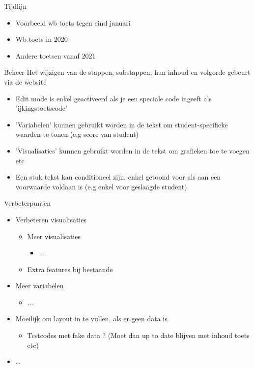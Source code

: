 \documentclass{beamer}
\begin{document}
\begin{frame}{Tijdlijn}
    \begin{itemize}
        \item Voorbeeld wb toets tegen eind januari
        \item Wb toets in 2020
        \item Andere toetsen vanaf 2021 
    \end{itemize}
\end{frame}

\begin{frame}{Beheer}
Het wijzigen van de stappen, substappen, hun inhoud en volgorde gebeurt via de website
	\begin{itemize}
		\item Edit mode is enkel geactiveerd als je een speciale code ingeeft als 'ijkingstoetscode'
		\item 'Variabelen' kunnen gebruikt worden in de tekst om student-specifieke waarden te tonen (e.g score van student)
		\item 'Visualisaties' kunnen gebruikt worden in de tekst om grafieken toe te voegen etc
		\item Een stuk tekst kan conditioneel zijn, enkel getoond voor als aan een voorwaarde voldaan is (e.g enkel voor geslaagde student)
	\end{itemize}
\end{frame}

\begin{frame}{Verbeterpunten}
    \begin{itemize}
    \item Verbeteren visualisaties
    \begin{itemize}
        \item Meer visualisaties
            \begin{itemize}
                \item ...
            \end{itemize}
        \item Extra features bij bestaande
    \end{itemize}
    \item Meer variabelen
    \begin{itemize}
    \item ...
    \end{itemize}
    \item Moeilijk om layout in te vullen, als er geen data is
        \begin{itemize}
            \item Testcodes met fake data ? (Moet dan up to date blijven met inhoud toets etc)
        \end{itemize}
     \item \ldots
    \end{itemize}
\end{frame}
\end{document}
